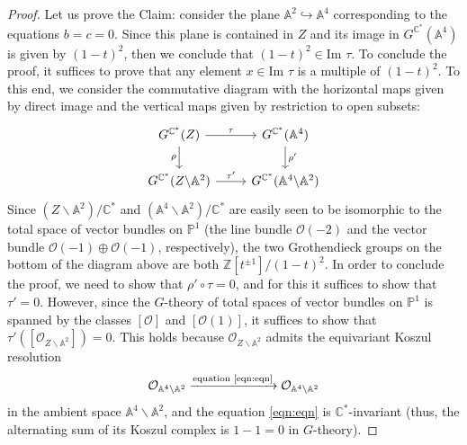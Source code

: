 \documentclass{amsart}
\def\BA{{\mathbb{A}}}
\def\BC{{\mathbb{C}}}
\def\BP{{\mathbb{P}}}
\def\BZ{{\mathbb{Z}}}
\def\CO{{\mathcal{O}}}
\begin{document}
\begin{proof}
\noindent Let us prove the Claim: consider the plane $\BA^2 \hookrightarrow \BA^4$ corresponding to the equations $b = c = 0$. Since this plane is contained in $Z$ and its image in $G^{\BC^*}(\BA^4)$ is given by $(1-t)^2$, then we conclude that $(1-t)^2 \in \text{Im }\tau$. To conclude the proof, it suffices to prove that any element $x \in \text{Im }\tau$ is a multiple of $(1-t)^2$. To this end, we consider the commutative diagram with the horizontal maps given by direct image and the vertical maps given by restriction to open subsets:
\[
\begin{tikzcd}
G^{\BC^*}(Z) \arrow[r,"\tau"] \arrow[d,"\rho"'] & G^{\BC^*}(\BA^4) \arrow[d,"\rho'"] \\
G^{\BC^*}(Z \backslash \BA^2) \arrow[r,"\tau'"] & G^{\BC^*}(\BA^4 \backslash \BA^2)
\end{tikzcd}
\]
Since $(Z \backslash \BA^2)/\BC^*$ and $(\BA^4 \backslash \BA^2)/\BC^*$ are easily seen to be isomorphic to the total space of vector bundles on $\BP^1$ (the line bundle $\CO(-2)$ and the vector bundle $\CO(-1) \oplus \CO(-1)$, respectively), the two Grothendieck groups on the bottom of the diagram above are both $\BZ[t^{\pm 1}]/(1-t)^2$. In order to conclude the proof, we need to show that $\rho' \circ \tau = 0$, and for this it suffices to show that $\tau' = 0$. However, since the $G$-theory of total spaces of vector bundles on $\BP^1$ is spanned by the classes $[\CO]$ and $[\CO(1)]$, it suffices to show that $\tau'([\CO_{Z\backslash \BA^2}])=0$. This holds because $\CO_{Z\backslash \BA^2}$ admits the equivariant Koszul resolution
\[
\CO_{\BA^4\backslash \BA^2} \xrightarrow{\text{equation \eqref{eqn:eqn}}} \CO_{\BA^4\backslash \BA^2}
\]
in the ambient space $\BA^4\backslash \BA^2$, and the equation \eqref{eqn:eqn} is $\BC^*$-invariant (thus, the alternating sum of its Koszul complex is $1-1=0$ in $G$-theory). \end{proof} 

\bigskip 
\end{document}
